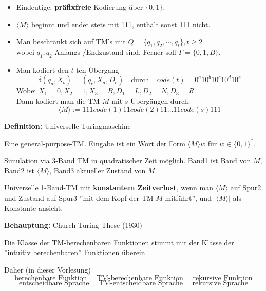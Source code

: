 \documentclass[a4paper,graphics,11pt]{article}
\newcommand{\godel}[1]{\langle #1 \rangle}
\begin{document}
\begin{itemize}
    \item Eindeutige, \textbf{präfixfreie} Kodierung über $\{0,1\}$.
    \item $\langle M \rangle$ beginnt und endet stets mit 111, enthält sonst 111 nicht.
    \item Man beschränkt sich auf TM's mit $Q= \{q_1,q_2,\cdots,q_t\}, t \geq 2$\\
        wobei $q_1,q_2$ Anfangs-/Endzustand sind. Ferner soll $\Gamma = \{0,1,B\}$.

    \item Man kodiert den $t$-ten Übergang
        $$
            \delta(q_a,X_b) = (q_c, X_d, D_e)
            \quad\text{durch}\quad
            code(t) = 0^a10^b10^c10^d10^e
        $$
        Wobei $X_1 = 0, X_2 = 1, X_3 = B, D_1 = L, D_2 = N, D_3 = R$.\\

        Dann kodiert man die TM $M$ mit $s$ Übergängen durch:
        $$
            \godel{M} := 111code(1)11code(2)11\dots 11code(s)111
        $$
\end{itemize}

\strut

\textbf{Definition:} Universelle Turingmaschine

Eine general-purpose-TM. Eingabe ist ein Wort der Form $\langle M\rangle w$ für $w \in \{0,1\}^*$.

Simulation via 3-Band TM in quadratischer Zeit möglich.
Band1 ist Band von $M$, Band2 ist $\godel{M}$, Band3 aktueller Zustand von $M$.

Universelle 1-Band-TM mit \textbf{konstantem Zeitverlust}, wenn man $\godel{M}$ auf Spur2 und Zustand
auf Spur3 ''mit dem Kopf der TM $M$ mitführt'', und $|\godel{M}|$ als Konstante ansieht.

\strut

\textbf{Behauptung:} Church-Turing-These (1930)

Die Klasse der TM-berechenbaren Funktionen stimmt mit der Klasse der\\
''intuitiv berechenbaren'' Funktionen überein.

Daher (in dieser Vorlesung)
$$
    \text{berechenbare Funktion} = \text{TM-berechenbare Funktion} = \text{rekursive Funktion}
$$$$
    \text{entscheidbare Sprache} = \text{TM-entscheidbare Sprache} = \text{rekursive Sprache}
$$



\newpage
\end{document}
